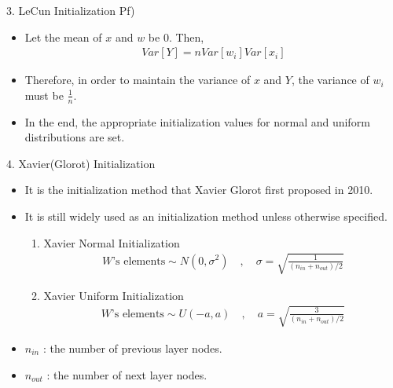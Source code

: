 \documentclass{beamer}
\begin{document}
	\begin{frame}{3. LeCun Initialization}
		Pf)
		\begin{itemize}
			\item Let the mean of $x$ and $w$ be 0. Then,
			\begin{gather*}
				Var[Y] = n Var[w_i]Var[x_i] 
			\end{gather*}
			\item Therefore, in order to maintain the variance of $x$ and $Y$, the variance of $w_i$ must be $\frac{1}{n}$.
			\item In the end, the appropriate initialization values for normal and uniform distributions are set.
		\end{itemize}
	\end{frame}	


	\begin{frame}{4. Xavier(Glorot) Initialization}
		\begin{itemize}
			\item It is the initialization method that Xavier Glorot first proposed in 2010\cite{glorot}.
			\item It is still widely used as an initialization method unless otherwise specified.
			\vspace{10pt}
			\begin{enumerate}
				\vspace{3pt}
				\item Xavier Normal Initialization
				\begin{gather*}
				W\text{'s elements} \sim N(0,\sigma^2) \quad , \quad \sigma = \sqrt{\frac{1}{(n_{in}+n_{out})/2}}  
				\end{gather*}
				\vspace{3pt}
				\item Xavier Uniform Initialization
				\begin{gather*}
				W\text{'s elements} \sim U(-a,a) \quad , \quad a = \sqrt{\frac{3}{(n_{in}+n_{out})/2}}  
				\end{gather*}
				\vspace{3pt}
			\end{enumerate}	
			\item $n_{in}$  : the number of previous layer nodes.
			\item $n_{out}$ : the number of next layer nodes.
		\end{itemize}
	\end{frame}	
\end{document}
